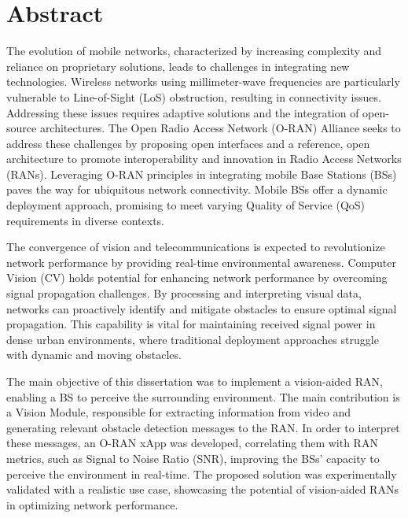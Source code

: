 
\chapter*{Abstract}
The evolution of mobile networks, characterized by increasing complexity and reliance on proprietary solutions, leads to challenges in integrating new technologies.
Wireless networks using millimeter-wave frequencies are particularly vulnerable to Line-of-Sight (LoS) obstruction, resulting in connectivity issues.
Addressing these issues requires adaptive solutions and the integration of open-source architectures.
The Open Radio Access Network (O-RAN) Alliance seeks to address these challenges by proposing open interfaces and a reference, open architecture to promote interoperability and innovation in Radio Access Networks (RANs).
Leveraging O-RAN principles in integrating mobile Base Stations (BSs) paves the way for ubiquitous network connectivity.
Mobile BSs offer a dynamic deployment approach, promising to meet varying Quality of Service (QoS) requirements in diverse contexts.

The convergence of vision and telecommunications is expected to revolutionize network performance by providing real-time environmental awareness.
Computer Vision (CV) holds potential for enhancing network performance by overcoming signal propagation challenges.
By processing and interpreting visual data, networks can proactively identify and mitigate obstacles to ensure optimal signal propagation.
This capability is vital for maintaining received signal power in dense urban environments, where traditional deployment approaches struggle with dynamic and moving obstacles.

The main objective of this dissertation was to implement a vision-aided RAN, enabling a BS to perceive the surrounding environment.
The main contribution is a Vision Module, responsible for extracting information from video and generating relevant obstacle detection messages to the RAN\@.
In order to interpret these messages, an O-RAN xApp was developed, correlating them with RAN metrics, such as Signal to Noise Ratio (SNR), improving the BSs' capacity to perceive the environment in real-time.
The proposed solution was experimentally validated with a realistic use case, showcasing the potential of vision-aided RANs in optimizing network performance.